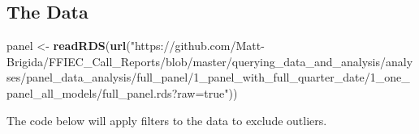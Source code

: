 \documentclass[]{article}
\newenvironment{Shaded}{\begin{snugshade}}{\end{snugshade}}
\newcommand{\KeywordTok}[1]{\textcolor[rgb]{0.13,0.29,0.53}{\textbf{#1}}}
\newcommand{\NormalTok}[1]{#1}
\newcommand{\StringTok}[1]{\textcolor[rgb]{0.31,0.60,0.02}{#1}}
\begin{document}
\hypertarget{the-data}{%
\subsection{The Data}\label{the-data}}

\begin{Shaded}
\begin{Highlighting}[]
\NormalTok{panel <-}\StringTok{ }\KeywordTok{readRDS}\NormalTok{(}\KeywordTok{url}\NormalTok{(}\StringTok{"https://github.com/Matt-Brigida/FFIEC_Call_Reports/blob/master/querying_data_and_analysis/analyses/panel_data_analysis/full_panel/1_panel_with_full_quarter_date/1_one_panel_all_models/full_panel.rds?raw=true"}\NormalTok{))}
\end{Highlighting}
\end{Shaded}

The code below will apply filters to the data to exclude outliers.
\end{document}
